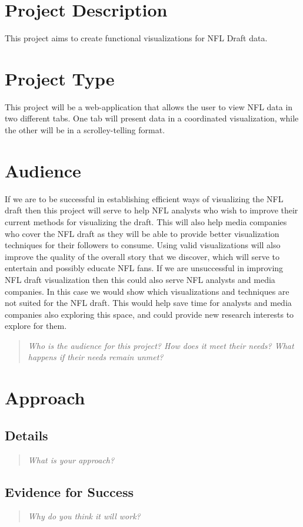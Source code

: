 \documentclass{proc}
\begin{document}
\section{Project Description}
This project aims to create functional visualizations for NFL Draft data. 
\section{Project Type}
This project will be a web-application that allows the user to view NFL data in two different tabs. One tab will present data in a coordinated visualization, while the other will be in a scrolley-telling format. 
\section{Audience} 
If we are to be successful in establishing efficient ways of visualizing the NFL draft then this project will serve to help NFL analysts who wish to improve their current methods for visualizing the draft. This will also help media companies who cover the NFL draft as they will be able to provide better visualization techniques for their followers to consume. Using valid visualizations will also improve the quality of the overall story that we discover, which will serve to entertain and possibly educate NFL fans. 
	If we are unsuccessful in improving NFL draft visualization then this could also serve NFL analysts and media companies. In this case we would show which visualizations and techniques are not suited for the NFL draft. This would help save time for analysts and media companies also exploring this space, and could provide new research interests to explore for them.
\begin{quote}
\textit{Who is the audience for this project? 
How does it meet their needs? 
What happens if their needs remain unmet?}
\end{quote}

\section{Approach}
\subsection{Details}
\begin{quote}
\textit{What is your approach?}

\end{quote}

\subsection{Evidence for Success}
\begin{quote}
\textit{Why do you think it will work?} 
\end{quote}
\end{document}
